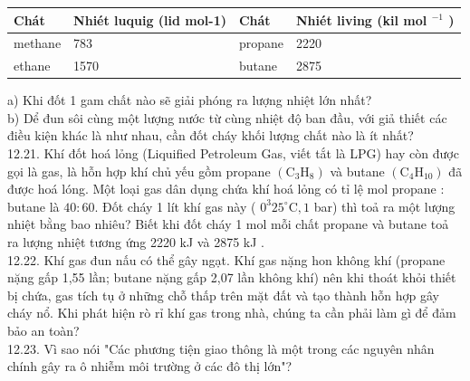 \documentclass[10pt]{article}
\begin{document}
\begin{center}
\begin{tabular}{|l|l|l|l|}
\hline
Chát & Nhiét luquig (lid mol-1) & Chát & Nhiét living (kil mol ${ }^{-1}$ ) \\
\hline
methane & 783 & propane & 2220 \\
\hline
ethane & 1570 & butane & 2875 \\
\hline
\end{tabular}
\end{center}

a) Khi đốt 1 gam chất nào sẽ giải phóng ra lượng nhiệt lớn nhất?\\
b) Dể đun sôi cùng một lượng nước từ cùng nhiệt độ ban đầu, với giả thiết các điều kiện khác là như nhau, cần đốt cháy khối lượng chất nào là ít nhất?\\
12.21. Khí đốt hoá lỏng (Liquified Petroleum Gas, viết tắt là LPG) hay còn được gọi là gas, là hỗn hợp khí chủ yếu gồm propane $\left(\mathrm{C}_{3} \mathrm{H}_{8}\right)$ và butane $\left(\mathrm{C}_{4} \mathrm{H}_{10}\right)$ đã được hoá lóng. Một loại gas dân dụng chứa khí hoá lỏng có tỉ lệ mol propane : butane là $40: 60$. Đốt cháy 1 lít khí gas này ( $0^{3} 25^{\circ} \mathrm{C}, 1$ bar) thì toả ra một lượng nhiệt bằng bao nhiêu? Biết khi đốt cháy 1 mol mỗi chất propane và butane toả ra lượng nhiệt tương ứng 2220 kJ và 2875 kJ .\\
12.22. Khí gas đun nấu có thể gây ngạt. Khí gas nặng hon không khí (propane nặng gấp 1,55 lần; butane nặng gấp 2,07 lần không khí) nên khi thoát khỏi thiết bị chứa, gas tích tụ ở những chỗ thấp trên mặt đất và tạo thành hỗn hợp gây cháy nổ. Khi phát hiện rò rỉ khí gas trong nhà, chúng ta cần phải làm gì để đảm bảo an toàn?\\
12.23. Vì sao nói "Các phương tiện giao thông là một trong các nguyên nhân chính gây ra ô nhiễm môi trường ở các đô thị lớn"?
\end{document}
